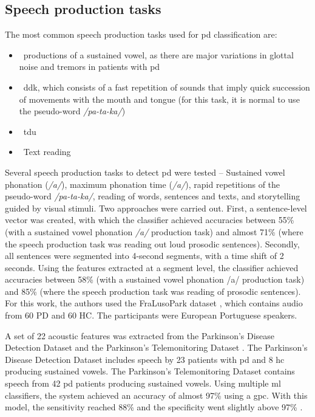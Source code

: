 \subsection{Speech production tasks}

The most common speech production tasks used for \gls{pd} classification are:

\begin{itemize}
	\item ~productions of a sustained vowel, as there are major variations in glottal noise and tremors in patients with \gls{pd} \cite{idiopathic_parkinson}
	\item ~\gls{ddk}, which consists of a fast repetition of sounds that imply quick succession of movements with the mouth and tongue (for this task, it is normal to use the pseudo-word \textit{/pa-ta-ka/})
	\item ~\gls{tdu}
	\item ~Text reading
\end{itemize}

Several speech production tasks to detect \gls{pd} were tested \cite{parkinson_acoustic_pompilli} -- Sustained vowel phonation (\textit{/a/}), maximum phonation time (\textit{/a/}), rapid repetitions of the pseudo-word \textit{/pa-ta-ka/}, reading of words, sentences and texts, and storytelling guided by visual stimuli. Two approaches were carried out. First, a sentence-level vector was created, with which the classifier achieved accuracies between 55\% (with a sustained vowel phonation \textit{/a/} production task) and almost 71\% (where the speech production task was reading out loud prosodic sentences). Secondly, all sentences were segmented into 4-second segments, with a time shift of 2 seconds. Using the features extracted at a segment level, the classifier achieved accuracies between 58\% (with a sustained vowel phonation /a/ production task) and 85\% (where the speech production task was reading of prosodic sentences). For this work, the authors used the FraLusoPark dataset \cite{fralusopark}, which contains audio from 60 PD and 60 HC. The participants were European Portuguese speakers.

A set of 22 acoustic features was extracted from the Parkinson’s Disease Detection Dataset \cite{PDDD} and the Parkinson’s Telemonitoring Dataset \cite{PTD}. The Parkinson’s Disease Detection Dataset includes speech by 23 patients with \gls{pd} and 8 \gls{hc} producing sustained vowels. The Parkinson’s Telemonitoring Dataset contains speech from 42 \gls{pd} patients producing sustained vowels. Using multiple \gls{ml} classifiers, the system achieved an accuracy of almost 97\% using a \gls{gpc}. With this model, the sensitivity reached 88\% and the specificity went slightly above 97\% \cite{parkinson_acoustic_despotovic}.

